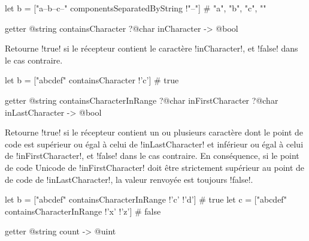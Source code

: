 \begin{galgas3}
let b = ["a--b--c--" componentsSeparatedByString !"--"]
# "a", "b", "c", ""
\end{galgas3}













\begin{galgas3box}
getter @string containsCharacter ?@char inCharacter -> @bool
\end{galgas3box}
Retourne \ggst!true! si le récepteur contient le caractère \ggst!inCharacter!, et \ggst!false! dans le cas contraire.

\begin{galgas3}
let b = ["abcdef" containsCharacter !'c'] # true
\end{galgas3}






\begin{galgas3box}
getter @string containsCharacterInRange
  ?@char inFirstCharacter
  ?@char inLastCharacter
  -> @bool
\end{galgas3box}

Retourne \ggst!true! si le récepteur contient un ou plusieurs caractère dont le point de code est supérieur ou égal à celui de \ggst!inLastCharacter! et inférieur ou égal à celui de \ggst!inFirstCharacter!, et \ggst!false! dans le cas contraire. En conséquence, si le point de code Unicode de \ggst!inFirstCharacter! doit être strictement supérieur au point de de code de \ggst!inLastCharacter!, la valeur renvoyée est toujours \ggst!false!.

\begin{galgas3}
let b = ["abcdef" containsCharacterInRange !'c' !'d'] # true
let c = ["abcdef" containsCharacterInRange !'x' !'z'] # false
\end{galgas3}









\begin{galgas3box}
getter @string count -> @uint
\end{galgas3box}

